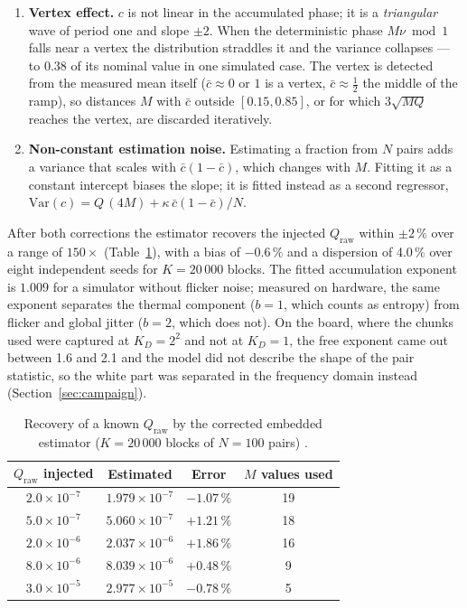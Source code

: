 \begin{enumerate}
\item \textbf{Vertex effect.} $c$ is not linear in the accumulated phase;
it is a \emph{triangular} wave of period one and slope $\pm2$. When the
deterministic phase $M\nu \bmod 1$ falls near a vertex the distribution
straddles it and the variance collapses --- to 0.38 of its nominal value
in one simulated case. The vertex is detected from the measured mean
itself ($\bar c \approx 0$ or $1$ is a vertex, $\bar c \approx \tfrac12$
the middle of the ramp), so distances $M$ with $\bar c$ outside
$[0.15, 0.85]$, or for which $3\sqrt{MQ}$ reaches the vertex, are
discarded iteratively.
\item \textbf{Non-constant estimation noise.} Estimating a fraction from
$N$ pairs adds a variance that scales with $\bar c(1-\bar c)$, which
changes with $M$. Fitting it as a constant intercept biases the slope; it
is fitted instead as a second regressor,
$\mathrm{Var}(c) = Q\,(4M) + \kappa\,\bar c(1-\bar c)/N$.
\end{enumerate}

After both corrections the estimator recovers the injected $Q_{\mathrm{raw}}$
within $\pm2\,\%$ over a range of $150\times$ (Table~\ref{tab:estimator}),
with a bias of $-0.6\,\%$ and a dispersion of 4.0\,\% over eight
independent seeds for $K=20\,000$ blocks. The fitted accumulation
exponent is $1.009$ for a simulator without flicker noise; measured on
hardware, the same exponent separates the thermal component ($b=1$, which
counts as entropy) from flicker and global jitter ($b=2$, which does not).
On the board, where the chunks used were captured at $K_D = 2^2$
and not at $K_D = 1$, the free exponent came out between 1.6 and 2.1
\meas{} and
the model did not describe the shape of the pair statistic, so the white
part was separated in the frequency domain instead
(Section~\ref{sec:campaign}).

\begin{table}[htbp]
\centering
\caption{Recovery of a known $Q_{\mathrm{raw}}$ by the corrected embedded
estimator ($K=20\,000$ blocks of $N=100$ pairs) \simu{}.}
\label{tab:estimator}
\begin{tabular}{@{}cccc@{}}
\toprule
$Q_{\mathrm{raw}}$ injected & Estimated & Error & $M$ values used \\
\midrule
$2.0\times10^{-7}$ & $1.979\times10^{-7}$ & $-1.07\,\%$ & 19 \\
$5.0\times10^{-7}$ & $5.060\times10^{-7}$ & $+1.21\,\%$ & 18 \\
$2.0\times10^{-6}$ & $2.037\times10^{-6}$ & $+1.86\,\%$ & 16 \\
$8.0\times10^{-6}$ & $8.039\times10^{-6}$ & $+0.48\,\%$ & 9 \\
$3.0\times10^{-5}$ & $2.977\times10^{-5}$ & $-0.78\,\%$ & 5 \\
\bottomrule
\end{tabular}
\end{table}

